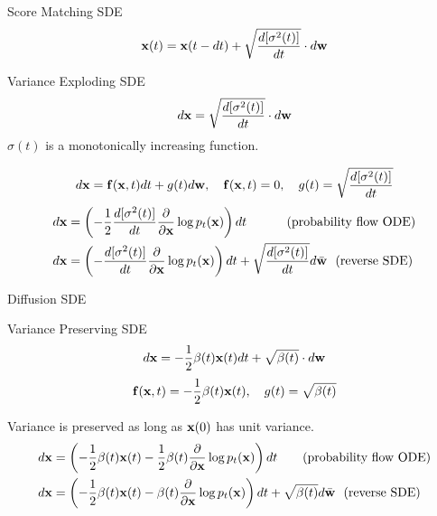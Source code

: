 \documentclass{beamer}
\begin{document}
\begin{frame}{Score Matching SDE}
	\vspace{-0.3cm}
	\[
		\mathbf{x}(t) = \mathbf{x}(t - dt) + \sqrt{\frac{ d [\sigma^2(t)]}{dt}} \cdot d \mathbf{w}
	\]
    \eqpause
	\vspace{-0.5cm}
	\begin{block}{Variance Exploding SDE}
		\vspace{-0.3cm}
		\[
			d \mathbf{x} = \sqrt{\frac{ d [\sigma^2(t)]}{dt}} \cdot d \mathbf{w}
		\]
		$\sigma(t)$ is a monotonically increasing function.
	\end{block}
    \eqpause
	\vspace{-0.7cm}
	\[
		d\mathbf{x} = \mathbf{f}(\mathbf{x}, t) dt + g(t) d \mathbf{w}, \quad \mathbf{f}(\mathbf{x}, t) = 0, \quad g(t) = \sqrt{\frac{ d [\sigma^2(t)]}{dt}} 
	\]
    \eqpause
	\vspace{-0.5cm}
	\begin{align*}
		d\mathbf{x} &= \left(-\frac{1}{2} \frac{ d [\sigma^2(t)]}{dt} \frac{\partial}{\partial \mathbf{x}} \log p_t(\mathbf{x}) \right) dt \qquad\quad\, \text{(probability flow ODE)} \\
		d\mathbf{x} &= \left(- \frac{ d [\sigma^2(t)]}{dt} \frac{\partial}{\partial \mathbf{x}}\log p_t(\mathbf{x})\right) dt + \sqrt{\frac{ d [\sigma^2(t)]}{dt}}  d \bar{\mathbf{w}} \ \ \text{(reverse SDE)}
	\end{align*}
\end{frame}
\begin{frame}{Diffusion SDE}
	\begin{block}{Variance Preserving SDE}
		\vspace{-0.3cm}
		\[
			d \mathbf{x} = - \frac{1}{2} \beta(t) \mathbf{x}(t) dt + \sqrt{\beta(t)} \cdot d \mathbf{w}
		\]
		\[
			\mathbf{f}(\mathbf{x}, t) = - \frac{1}{2} \beta(t) \mathbf{x}(t) , \quad g(t) = \sqrt{\beta(t)} 
		\]
	\end{block}
	Variance is preserved as long as $\mathbf{x}(0)$ has unit variance.
    \eqpause
	\begin{align*}
		d\mathbf{x} &= \left(- \frac{1}{2} \beta(t) \mathbf{x}(t) - \frac{1}{2} \beta(t) \frac{\partial}{\partial \mathbf{x}} \log p_t(\mathbf{x}) \right) dt \quad\quad \text{(probability flow ODE)} \\
		d\mathbf{x} &= \left(- \frac{1}{2} \beta(t) \mathbf{x}(t) - \beta(t) \frac{\partial}{\partial \mathbf{x}} \log p_t(\mathbf{x})\right) dt + \sqrt{\beta(t)} d \bar{\mathbf{w}}\ \ \text{(reverse SDE)}
	\end{align*}
\end{frame}
\end{document}
